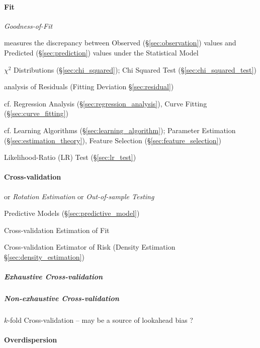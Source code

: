 \paragraph{Fit}\label{sec:model_fit}\hfill

\emph{Goodness-of-Fit}

measures the discrepancy between Observed (\S\ref{sec:observation}) values and
Predicted (\S\ref{sec:prediction}) values under the Statistical Model

$\chi^2$ Distributions (\S\ref{sec:chi_squared});
Chi Squared Test (\S\ref{sec:chi_squared_test})

\fist analysis of Residuals (Fitting Deviation \S\ref{sec:residual})

cf. Regression Analysis (\S\ref{sec:regression_analysis}), Curve Fitting
(\S\ref{sec:curve_fitting})

\fist cf. Learning Algorithms (\S\ref{sec:learning_algorithm});
Parameter Estimation (\S\ref{sec:estimation_theory}), Feature Selection
(\S\ref{sec:feature_selection})

Likelihood-Ratio (LR) Test (\S\ref{sec:lr_test})



\paragraph{Cross-validation}\label{sec:cross_validation}\hfill

or \emph{Rotation Estimation} or \emph{Out-of-sample Testing}

Predictive Models (\S\ref{sec:predictive_model})

Cross-validation Estimation of Fit

Cross-validation Estimator of Risk (Density Estimation
\S\ref{sec:density_estimation})



\subparagraph{Exhaustive Cross-validation}
\label{sec:exhaustive_cross_validation}\hfill

\subparagraph{Non-exhaustive Cross-validation}
\label{sec:exhaustive_cross_validation}\hfill

$k$-fold Cross-validation -- may be a source of lookahead bias ?



\paragraph{Overdispersion}\label{sec:overdispersion}\hfill

